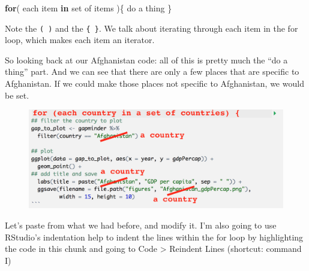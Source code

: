 \documentclass[]{book}
\newenvironment{Shaded}{\begin{snugshade}}{\end{snugshade}}
\newcommand{\ControlFlowTok}[1]{\textcolor[rgb]{0.13,0.29,0.53}{\textbf{#1}}}
\newcommand{\NormalTok}[1]{#1}
\theoremstyle{definition}
\theoremstyle{definition}
\theoremstyle{definition}
\theoremstyle{remark}
\begin{document}
\begin{Shaded}
\begin{Highlighting}[]
\ControlFlowTok{for}\NormalTok{( each item }\ControlFlowTok{in}\NormalTok{ set of items )\{}
\NormalTok{  do a thing}
\NormalTok{\}}
\end{Highlighting}
\end{Shaded}

Note the \texttt{(\ )} and the \texttt{\{\ \}}. We talk about iterating
through each item in the for loop, which makes each item an iterator.

So looking back at our Afghanistan code: all of this is pretty much the
``do a thing'' part. And we can see that there are only a few places
that are specific to Afghanistan. If we could make those places not
specific to Afghanistan, we would be set.

\begin{figure}
\centering
\includegraphics{img/for_loop_logic.png}
\caption{}
\end{figure}

Let's paste from what we had before, and modify it. I'm also going to
use RStudio's indentation help to indent the lines within the for loop
by highlighting the code in this chunk and going to Code \textgreater{}
Reindent Lines (shortcut: command I)
\end{document}

